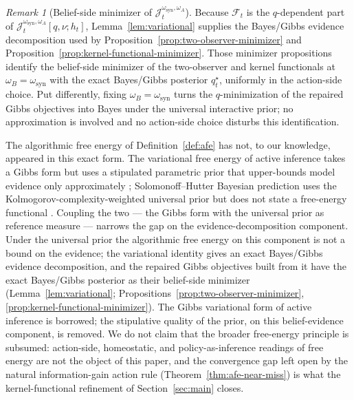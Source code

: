 \documentclass[11pt]{article}
\theoremstyle{definition}
\theoremstyle{remark}
\newtheorem{remark}[theorem]{Remark}
\theoremstyle{plain}
\theoremstyle{definition}
\newcommand{\Fcal}{\mathcal{F}}
\begin{document}
\begin{remark}[Belief-side minimizer of $\mathcal J_t^{\omega_{\mathrm{syn}},\omega_A}$]
\label{rem:afe-bayes-unification}
Because $\Fcal_t$ is the $q$-dependent part of $\mathcal J_t^{\omega_{\mathrm{syn}},\omega_A}[q,\nu;h_t]$, Lemma~\ref{lem:variational} supplies the Bayes/Gibbs evidence decomposition used by Proposition~\ref{prop:two-observer-minimizer} and Proposition~\ref{prop:kernel-functional-minimizer}. Those minimizer propositions identify the belief-side minimizer of the two-observer and kernel functionals at $\omega_B=\omega_{\mathrm{syn}}$ with the exact Bayes/Gibbs posterior $q_t^\star$, uniformly in the action-side choice. Put differently, fixing $\omega_B=\omega_{\mathrm{syn}}$ turns the $q$-minimization of the repaired Gibbs objectives into Bayes under the universal interactive prior; no approximation is involved and no action-side choice disturbs this identification.

The algorithmic free energy of Definition~\ref{def:afe} has not, to our knowledge, appeared in this exact form. The variational free energy of active inference takes a Gibbs form but uses a stipulated parametric prior that upper-bounds model evidence only approximately \citep{Friston2010,ParrFriston2019}; Solomonoff--Hutter Bayesian prediction uses the Kolmogorov-complexity-weighted universal prior but does not state a free-energy functional \citep{Solomonoff1964a,Solomonoff1964b,Hutter2005}. Coupling the two --- the Gibbs form with the universal prior as reference measure --- narrows the gap on the evidence-decomposition component. Under the universal prior the algorithmic free energy on this component is not a bound on the evidence; the variational identity gives an exact Bayes/Gibbs evidence decomposition, and the repaired Gibbs objectives built from it have the exact Bayes/Gibbs posterior as their belief-side minimizer (Lemma~\ref{lem:variational}; Propositions~\ref{prop:two-observer-minimizer}, \ref{prop:kernel-functional-minimizer}). The Gibbs variational form of active inference is borrowed; the stipulative quality of the prior, on this belief-evidence component, is removed. We do not claim that the broader free-energy principle is subsumed: action-side, homeostatic, and policy-as-inference readings of free energy are not the object of this paper, and the convergence gap left open by the natural information-gain action rule (Theorem~\ref{thm:afe-near-miss}) is what the kernel-functional refinement of Section~\ref{sec:main} closes.
\end{remark}
\end{document}
